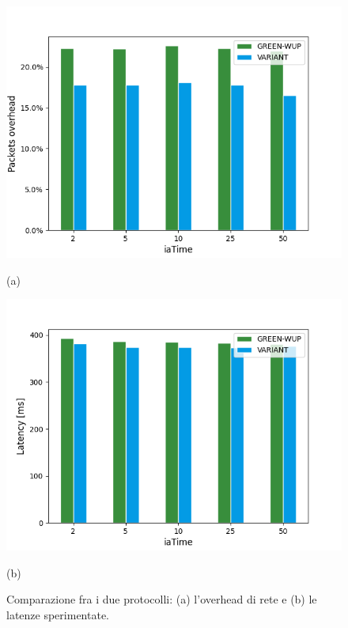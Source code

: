 \documentclass{report}
\begin{document}
\begin{figure}
    \centering
    \begin{minipage}{.5\textwidth}
        \centering
        \includegraphics[width=1\linewidth]{overhead_plot.png}
        \caption*{(a)}
    \end{minipage}%
    \begin{minipage}{.5\textwidth}
        \centering
        \includegraphics[width=1\linewidth]{latency_plot.png}
        \caption*{(b)}
    \end{minipage}
    \caption{Comparazione fra i due protocolli: (a) l'overhead di rete e (b) le latenze sperimentate.}
\end{figure}
\end{document}
